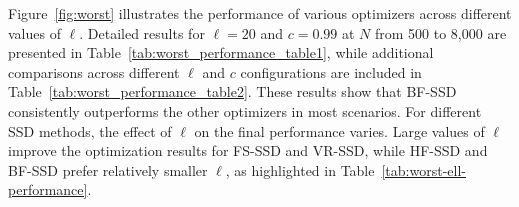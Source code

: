 \documentclass[10pt]{article} %
\numberwithin{equation}{section}
\theoremstyle{plain}
\theoremstyle{definition}
\newcommand{\<}{\langle}
\renewcommand{\>}{\rangle}
\renewcommand{\(}{\left(}
\renewcommand{\)}{\right)}
\renewcommand{\[}{\left[}
\renewcommand{\]}{\right]}
\begin{document}
Figure~\ref{fig:worst} illustrates the performance of various optimizers across different values of $\ell$. Detailed results for $\ell=20$ and $c=0.99$ at $N$ from 500 to 8,000 are presented in Table~\ref{tab:worst_performance_table1}, while additional comparisons across different $\ell$ and $c$ configurations are included in Table~\ref{tab:worst_performance_table2}. These results show that BF-SSD consistently outperforms the other optimizers in most scenarios. For different SSD methods, the effect of $\ell$ on the final performance varies. Large values of $\ell$ improve the optimization results for FS-SSD and VR-SSD, while HF-SSD and BF-SSD prefer relatively smaller $\ell$, as highlighted in Table~\ref{tab:worst-ell-performance}. 

\end{document}
